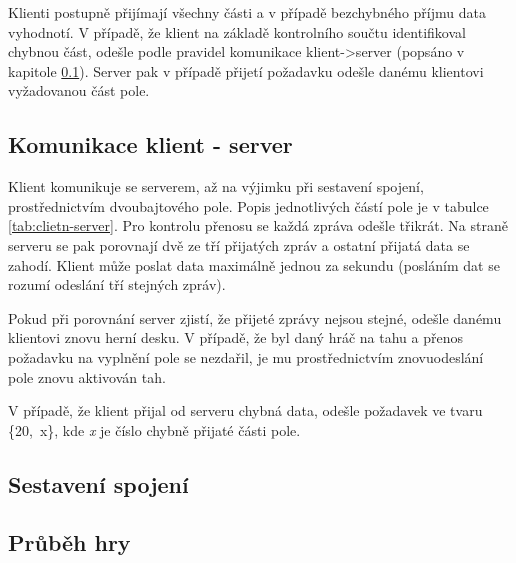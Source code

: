 Klienti postupně přijímají všechny části a v případě bezchybného příjmu data vyhodnotí. V případě, že klient na základě kontrolního součtu identifikoval chybnou část, odešle podle pravidel komunikace klient->server (popsáno v kapitole \ref{sec:comm_client-server}). Server pak v případě přijetí požadavku odešle danému klientovi vyžadovanou část pole.



\subsection{Komunikace klient - server}
\label{sec:comm_client-server}
Klient komunikuje se serverem, až na výjimku při sestavení spojení, prostřednictvím dvoubajtového pole. Popis jednotlivých částí pole je v tabulce \ref{tab:clietn-server}. Pro kontrolu přenosu se každá zpráva odešle třikrát. Na straně serveru se pak porovnají dvě ze tří přijatých zpráv a ostatní přijatá data se zahodí. Klient může poslat data maximálně jednou za sekundu (posláním dat se rozumí odeslání tří stejných zpráv).

Pokud při porovnání server zjistí, že přijeté zprávy nejsou stejné, odešle danému klientovi znovu herní desku. V případě, že byl daný hráč na tahu a přenos požadavku na vyplnění pole se nezdařil, je mu prostřednictvím znovuodeslání pole znovu aktivován tah.

V případě, že klient přijal od serveru chybná data, odešle požadavek ve tvaru \mbox{\{20, x\}}, kde \textit{x} je číslo chybně přijaté části pole.




\subsection{Sestavení spojení}
\inProgress

\subsection{Průběh hry}
\inProgress
